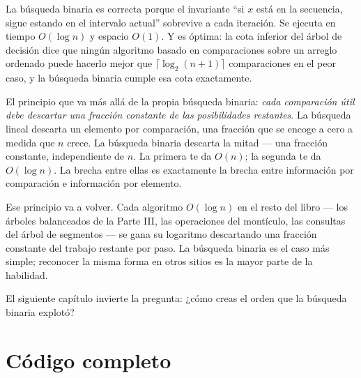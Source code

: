 \documentclass[11pt,a4paper]{article}
\begin{document}
La búsqueda binaria es correcta porque el invariante ``si $x$ está en la secuencia, sigue estando en el intervalo actual'' sobrevive a cada iteración. Se ejecuta en tiempo $O(\log n)$ y espacio $O(1)$. Y es óptima: la cota inferior del árbol de decisión dice que ningún algoritmo basado en comparaciones sobre un arreglo ordenado puede hacerlo mejor que $\lceil \log_2(n+1) \rceil$ comparaciones en el peor caso, y la búsqueda binaria cumple esa cota exactamente.

El principio que va más allá de la propia búsqueda binaria: \emph{cada comparación útil debe descartar una fracción constante de las posibilidades restantes}. La búsqueda lineal descarta un elemento por comparación, una fracción que se encoge a cero a medida que $n$ crece. La búsqueda binaria descarta la mitad --- una fracción constante, independiente de $n$. La primera te da $O(n)$; la segunda te da $O(\log n)$. La brecha entre ellas es exactamente la brecha entre información por comparación e información por elemento.

Ese principio va a volver. Cada algoritmo $O(\log n)$ en el resto del libro --- los árboles balanceados de la Parte III, las operaciones del montículo, las consultas del árbol de segmentos --- se gana su logaritmo descartando una fracción constante del trabajo restante por paso. La búsqueda binaria es el caso más simple; reconocer la misma forma en otros sitios es la mayor parte de la habilidad.

El siguiente capítulo invierte la pregunta: ¿cómo creas el orden que la búsqueda binaria explotó?

\section{Código completo}
\end{document}
